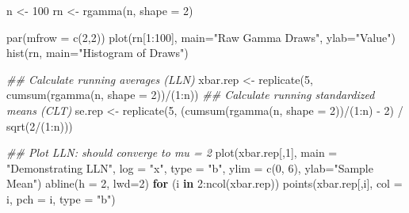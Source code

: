 \documentclass[
  letterpaper,
  DIV=11,
  numbers=noendperiod]{scrreprt}
\newenvironment{Shaded}{\begin{snugshade}}{\end{snugshade}}
\newcommand{\AttributeTok}[1]{\textcolor[rgb]{0.40,0.45,0.13}{#1}}
\newcommand{\ControlFlowTok}[1]{\textcolor[rgb]{0.00,0.23,0.31}{\textbf{#1}}}
\newcommand{\DecValTok}[1]{\textcolor[rgb]{0.68,0.00,0.00}{#1}}
\newcommand{\DocumentationTok}[1]{\textcolor[rgb]{0.37,0.37,0.37}{\textit{#1}}}
\newcommand{\FunctionTok}[1]{\textcolor[rgb]{0.28,0.35,0.67}{#1}}
\newcommand{\NormalTok}[1]{\textcolor[rgb]{0.00,0.23,0.31}{#1}}
\newcommand{\OtherTok}[1]{\textcolor[rgb]{0.00,0.23,0.31}{#1}}
\newcommand{\SpecialCharTok}[1]{\textcolor[rgb]{0.37,0.37,0.37}{#1}}
\newcommand{\StringTok}[1]{\textcolor[rgb]{0.13,0.47,0.30}{#1}}
\begin{document}
\begin{Shaded}
\begin{Highlighting}[]
\NormalTok{n }\OtherTok{\textless{}{-}} \DecValTok{100}
\NormalTok{rn }\OtherTok{\textless{}{-}} \FunctionTok{rgamma}\NormalTok{(n, }\AttributeTok{shape =} \DecValTok{2}\NormalTok{)}

\FunctionTok{par}\NormalTok{(}\AttributeTok{mfrow =} \FunctionTok{c}\NormalTok{(}\DecValTok{2}\NormalTok{,}\DecValTok{2}\NormalTok{))}
\FunctionTok{plot}\NormalTok{(rn[}\DecValTok{1}\SpecialCharTok{:}\DecValTok{100}\NormalTok{], }\AttributeTok{main=}\StringTok{"Raw Gamma Draws"}\NormalTok{, }\AttributeTok{ylab=}\StringTok{"Value"}\NormalTok{)}
\FunctionTok{hist}\NormalTok{(rn, }\AttributeTok{main=}\StringTok{"Histogram of Draws"}\NormalTok{)}

\DocumentationTok{\#\# Calculate running averages (LLN)}
\NormalTok{xbar.rep }\OtherTok{\textless{}{-}} \FunctionTok{replicate}\NormalTok{(}\DecValTok{5}\NormalTok{, }\FunctionTok{cumsum}\NormalTok{(}\FunctionTok{rgamma}\NormalTok{(n, }\AttributeTok{shape =} \DecValTok{2}\NormalTok{))}\SpecialCharTok{/}\NormalTok{(}\DecValTok{1}\SpecialCharTok{:}\NormalTok{n))}
\DocumentationTok{\#\# Calculate running standardized means (CLT)}
\NormalTok{se.rep }\OtherTok{\textless{}{-}} \FunctionTok{replicate}\NormalTok{(}\DecValTok{5}\NormalTok{, (}\FunctionTok{cumsum}\NormalTok{(}\FunctionTok{rgamma}\NormalTok{(n, }\AttributeTok{shape =} \DecValTok{2}\NormalTok{))}\SpecialCharTok{/}\NormalTok{(}\DecValTok{1}\SpecialCharTok{:}\NormalTok{n) }\SpecialCharTok{{-}} \DecValTok{2}\NormalTok{) }\SpecialCharTok{/} \FunctionTok{sqrt}\NormalTok{(}\DecValTok{2}\SpecialCharTok{/}\NormalTok{(}\DecValTok{1}\SpecialCharTok{:}\NormalTok{n)))}

\DocumentationTok{\#\# Plot LLN: should converge to mu = 2}
\FunctionTok{plot}\NormalTok{(xbar.rep[,}\DecValTok{1}\NormalTok{], }\AttributeTok{main =} \StringTok{"Demonstrating LLN"}\NormalTok{, }\AttributeTok{log =} \StringTok{"x"}\NormalTok{, }\AttributeTok{type =} \StringTok{"b"}\NormalTok{, }\AttributeTok{ylim =} \FunctionTok{c}\NormalTok{(}\DecValTok{0}\NormalTok{, }\DecValTok{6}\NormalTok{), }\AttributeTok{ylab=}\StringTok{"Sample Mean"}\NormalTok{)}
\FunctionTok{abline}\NormalTok{(}\AttributeTok{h =} \DecValTok{2}\NormalTok{, }\AttributeTok{lwd=}\DecValTok{2}\NormalTok{)}
\ControlFlowTok{for}\NormalTok{ (i }\ControlFlowTok{in} \DecValTok{2}\SpecialCharTok{:}\FunctionTok{ncol}\NormalTok{(xbar.rep)) }\FunctionTok{points}\NormalTok{(xbar.rep[,i], }\AttributeTok{col =}\NormalTok{ i, }\AttributeTok{pch =}\NormalTok{ i, }\AttributeTok{type =} \StringTok{"b"}\NormalTok{)}


\end{Highlighting}
\end{Shaded}
\end{document}
